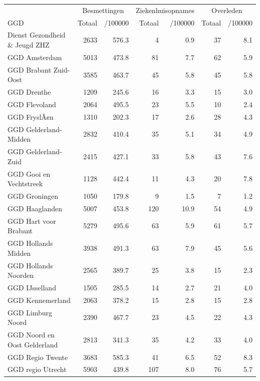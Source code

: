 \documentclass[
  english,
  man,floatsintext]{apa6}
\begin{document}
\begin{table}[H]
\centering\begingroup\fontsize{10}{12}\selectfont

\begin{threeparttable}
\begin{tabular}{lrrrrrr}
\toprule
\multicolumn{1}{c}{ } & \multicolumn{2}{c}{Besmettingen} & \multicolumn{2}{c}{Ziekenhuisopnames} & \multicolumn{2}{c}{Overleden} \\
\cmidrule(l{3pt}r{3pt}){2-3} \cmidrule(l{3pt}r{3pt}){4-5} \cmidrule(l{3pt}r{3pt}){6-7}
GGD & Totaal & /100000 & Totaal & /100000 & Totaal & /100000\\
\midrule
Dienst Gezondheid \& Jeugd ZHZ & 2633 & 576.3 & 4 & 0.9 & 37 & 8.1\\
GGD Amsterdam & 5013 & 473.8 & 81 & 7.7 & 62 & 5.9\\
GGD Brabant Zuid-Oost & 3585 & 463.7 & 45 & 5.8 & 45 & 5.8\\
GGD Drenthe & 1209 & 245.6 & 16 & 3.3 & 15 & 3.0\\
GGD Flevoland & 2064 & 495.5 & 23 & 5.5 & 10 & 2.4\\
GGD FryslÃ¢n & 1310 & 202.3 & 17 & 2.6 & 28 & 4.3\\
GGD Gelderland-Midden & 2832 & 410.4 & 35 & 5.1 & 34 & 4.9\\
GGD Gelderland-Zuid & 2415 & 427.1 & 33 & 5.8 & 43 & 7.6\\
GGD Gooi en Vechtstreek & 1128 & 442.4 & 11 & 4.3 & 20 & 7.8\\
GGD Groningen & 1050 & 179.8 & 9 & 1.5 & 7 & 1.2\\
GGD Haaglanden & 5007 & 453.8 & 120 & 10.9 & 54 & 4.9\\
GGD Hart voor Brabant & 5279 & 495.6 & 63 & 5.9 & 61 & 5.7\\
GGD Hollands Midden & 3938 & 491.3 & 63 & 7.9 & 45 & 5.6\\
GGD Hollands Noorden & 2565 & 389.7 & 25 & 3.8 & 15 & 2.3\\
GGD IJsselland & 1505 & 285.5 & 14 & 2.7 & 21 & 4.0\\
GGD Kennemerland & 2063 & 378.2 & 15 & 2.8 & 15 & 2.8\\
GGD Limburg Noord & 2390 & 467.7 & 23 & 4.5 & 22 & 4.3\\
GGD Noord en Oost Gelderland & 2813 & 341.3 & 35 & 4.2 & 33 & 4.0\\
GGD Regio Twente & 3683 & 585.3 & 41 & 6.5 & 52 & 8.3\\
GGD regio Utrecht & 5903 & 439.8 & 107 & 8.0 & 76 & 5.7\\

\end{tabular}
\end{threeparttable}
\end{table}
\end{document}
